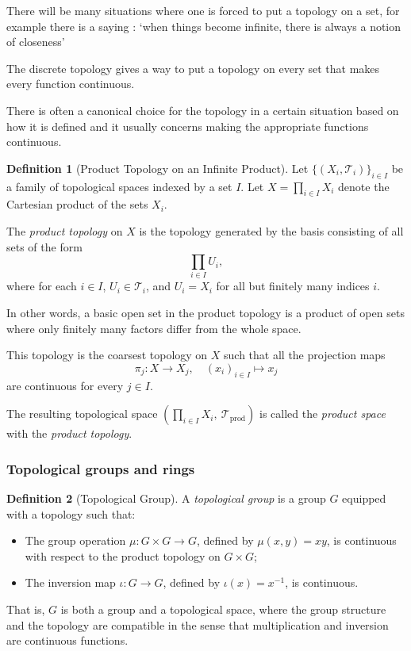 \documentclass{article}
\theoremstyle{definition}
\newtheorem{definition}{Definition}[section]
\theoremstyle{definition}
\theoremstyle{definition}
\begin{document}
There will be many situations where one is forced to put a topology on a set, for example there is a saying : `when things become infinite, there is always a notion of closeness'


The discrete topology gives a way to put a topology on every set that makes every function continuous.

There is often a canonical choice for the topology in a certain situation based on how it is defined and it usually concerns making the appropriate functions continuous.


\begin{definition}[Product Topology on an Infinite Product]
Let $\{ (X_i, \mathcal{T}_i) \}_{i \in I}$ be a family of topological spaces indexed by a set $I$. Let $X = \prod_{i \in I} X_i$ denote the Cartesian product of the sets $X_i$.

The \emph{product topology} on $X$ is the topology generated by the basis consisting of all sets of the form
\[
\prod_{i \in I} U_i,
\]
where for each $i \in I$, $U_i \in \mathcal{T}_i$, and $U_i = X_i$ for all but finitely many indices $i$.

In other words, a basic open set in the product topology is a product of open sets where only finitely many factors differ from the whole space.

This topology is the coarsest topology on $X$ such that all the projection maps
\[
\pi_j : X \to X_j, \quad (x_i)_{i \in I} \mapsto x_j
\]
are continuous for every $j \in I$.

The resulting topological space $\left( \prod_{i \in I} X_i,\ \mathcal{T}_{\text{prod}} \right)$ is called the \emph{product space} with the \emph{product topology}.
\end{definition}

\subsubsection{Topological groups and rings}

\begin{definition}[Topological Group]
A \emph{topological group} is a group \( G \) equipped with a topology such that:
\begin{itemize}
    \item The group operation \( \mu : G \times G \to G \), defined by \( \mu(x, y) = xy \), is continuous with respect to the product topology on \( G \times G \);
    \item The inversion map \( \iota : G \to G \), defined by \( \iota(x) = x^{-1} \), is continuous.
\end{itemize}
That is, \( G \) is both a group and a topological space, where the group structure and the topology are compatible in the sense that multiplication and inversion are continuous functions.
\end{definition}
\end{document}
